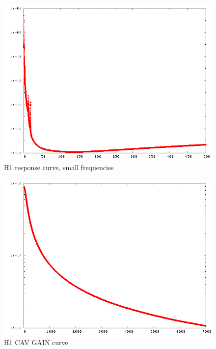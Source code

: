 \documentclass[12pt]{article}
\begin{document}
\begin{figure}
\label{h1_response_2}
\centering
\includegraphics[scale=0.5]{S2/h1_response-3.png}
\caption{H1 response curve, small frequencies}
\end{figure}

\begin{figure}
\label{h1_cav_gain_1}
\centering
\includegraphics[scale=0.5]{S2/h1_cav_gain-1.png}
\caption{H1 CAV GAIN curve}
\end{figure}
\end{document}
